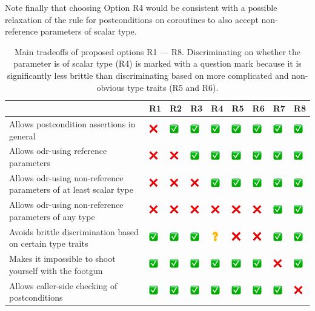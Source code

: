 Note finally that choosing Option R4 would be consistent with a possible relaxation of the rule for postconditions on coroutines to also accept non-reference parameters of scalar type.

\newcommand{\yes}{\includegraphics[width=4mm]{images/yes.png}}
\newcommand{\no}{\includegraphics[width=4mm]{images/no.png}}
\newcommand{\maybe}{\includegraphics[width=4mm]{images/maybe.png}}
\begin{table}[b]
\begin{tabular}{|p{5.4cm}|p{0.9cm}|p{0.9cm}|p{0.9cm}|p{0.9cm}|p{0.9cm}|p{0.9cm}|p{0.9cm}|p{0.9cm}|}
\hline 
& R1 & R2 & R3 & R4 & R5 & R6 & R7 & R8 \\
\hline
Allows postcondition assertions in general & \no & \yes  & \yes  & \yes & \yes & \yes & \yes & \yes \\ \hline
Allows odr-using reference parameters & \no & \no  & \yes  & \yes & \yes & \yes & \yes & \yes \\ \hline
Allows odr-using non-reference parameters of at least scalar type& \no & \no  & \no  & \yes & \yes & \yes & \yes & \yes \\ \hline
Allows odr-using non-reference parameters of any type& \no & \no  & \no  & \no & \no & \no & \yes & \yes \\ \hline
Avoids brittle discrimination based on certain type traits& \yes & \yes  & \yes  & \maybe & \no & \no & \yes & \yes \\ \hline
Makes it impossible to shoot yourself with the footgun& \yes & \yes  & \yes  & \yes & \yes & \yes & \no & \yes \\ \hline
Allows caller-side checking of postconditions& \yes & \yes  & \yes  & \yes & \yes & \yes & \yes & \no \\ \hline
\end{tabular}
\vspace{2mm}
\caption{Main tradeoffs of proposed options R1 --- R8. Discriminating on whether the parameter is of scalar type (R4) is marked with a question mark because it is significantly less brittle than discriminating based on more complicated and non-obvious type traits (R5 and R6).}
\label{tradeoffs}
\end{table}

